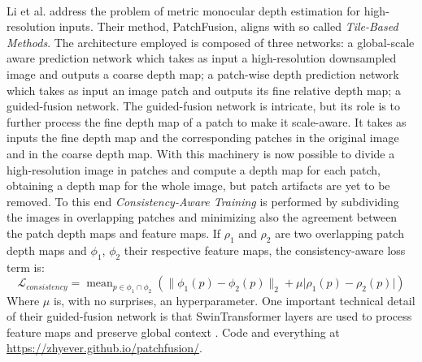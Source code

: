 \\
Li et al. \cite{PatchFusion} address the problem of metric monocular depth estimation for high-resolution inputs. Their method, PatchFusion, aligns with so called \textit{Tile-Based Methods}. The architecture employed is composed of three networks: a global-scale aware prediction network which takes as input a high-resolution downsampled image and outputs a coarse depth map; a patch-wise depth prediction network which takes as input an image patch and outputs its fine relative depth map; a guided-fusion network. The guided-fusion network is intricate, but its role is to further process the fine depth map of a patch to make it scale-aware. It takes as inputs the fine depth map and the corresponding patches in the original image and in the coarse depth map. With this machinery is now possible to divide a high-resolution image in patches and compute a depth map for each patch, obtaining a depth map for the whole image, but patch artifacts are yet to be removed. To this end \textit{Consistency-Aware Training} is performed by subdividing the images in overlapping patches and minimizing also the agreement between the patch depth maps and feature maps. If $\rho_{1}$ and $\rho_{2}$ are two overlapping patch depth maps and $\phi_{1}$, $\phi_{2}$ their respective feature maps, the consistency-aware loss term is:
\[
	\mathcal{L}_{consistency} = \mathop{\text{mean}}_{p \in \phi_{1} \cap \phi_{2}} \left( \big\| \phi_{1}(p) - \phi_{2}(p) \big\|_{2} + \mu \big| \rho_{1}(p) - \rho_{2}(p) \big| \right)
\]
Where $\mu$ is, with no surprises, an hyperparameter. One important technical detail of their guided-fusion network is that SwinTransformer layers \cite{swin} are used to process feature maps and preserve global context \cite{PatchFusion}. Code and everything at \url{https://zhyever.github.io/patchfusion/}.\\
\\
